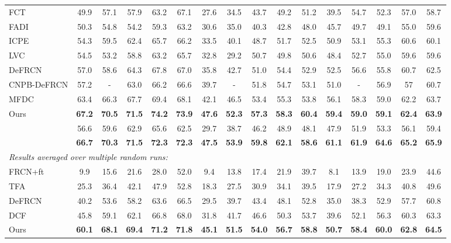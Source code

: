 \documentclass{article}
\begin{document}
\begin{table*}[!hbt]
\begin{adjustbox}{width=1\textwidth}
{\begin{tabular}{l|ccccc|ccccc|ccccc}
     FCT \cite{FCT} & 49.9 & 57.1 & 57.9 & 63.2 & 67.1 &27.6& 34.5 &43.7& 49.2 &51.2& 39.5 &54.7&52.3&57.0&58.7  \\
     FADI\cite{FADI} &50.3&54.8&54.2&59.3&63.2&30.6&35.0&40.3&42.8&48.0&45.7&49.7&49.1&55.0&59.6\\
     ICPE \cite{ICPE} & 54.3 & 59.5 &62.4 & 65.7 & 66.2 & 33.5 &40.1& 48.7 &51.7& 52.5 & 50.9 &53.1&55.3&60.6&60.1  \\
     LVC \cite{LVC} & 54.5 &53.2 & 58.8 & 63.2 & 65.7 &32.8& 29.2 &50.7& 49.8 & 50.6 &48.4&52.7&55.0&59.6&59.6  \\
    DeFRCN \cite{defrcn} &57.0 &58.6&64.3&67.8&67.0&35.8&42.7&51.0&54.4&52.9&52.5&56.6&55.8&60.7&62.5 \\
     CNPB-DeFRCN \cite{CNPB} & 57.2 &- & 63.0 & 66.2 & 66.6 &39.7& - &51.8& 54.7 & 53.1 &51.0&-&56.9&57&60.7  \\
     MFDC \cite{MFD} & 63.4 &66.3 & 67.7 & 69.4 & 68.1 &42.1& 46.5 &53.4& 55.3 & 53.8 &56.1&58.3&59.0&62.2&63.7  \\
    \rowcolor{Gray}
    Ours   &{\bf 67.2}&{\bf 70.5}&{\bf 71.5}&{\bf 74.2}&{\bf 73.9}&{\bf 47.6}&{\bf 52.3}&{\bf 57.3}&{\bf 58.3}&{\bf 60.4}&{\bf 59.4}&{\bf 59.0}&{\bf 59.1}&{\bf 62.4}&{\bf 63.9}\\
    \hline 
     \cite{dcf}   &56.6&59.6&62.9&65.6&62.5&29.7&38.7&46.2&48.9&48.1&47.9&51.9&53.3&56.1&59.4 \\
    \rowcolor{Gray}
       &{\bf 66.7}&{\bf 70.3}&{\bf 71.5}&{\bf 72.3}&{\bf 72.3}&{\bf 47.5}&{\bf 53.9}&{\bf 59.8}&{\bf 62.1}&{\bf 58.6}&{\bf 61.1}&{\bf 61.9}&{\bf 64.6}&{\bf 65.2}&{\bf 65.9}\\
    \midrule 
\multicolumn{16}{l}{\textit{Results averaged over multiple random runs:}}\\
    FRCN+ft \cite{metarcnn} & 9.9& 15.6  &21.6  &28.0  &52.0  &9.4& 13.8& 17.4&21.9& 39.7 &8.1&13.9&19.0&23.9&44.6\\
    TFA  \cite{tfa} & 25.3 & 36.4 & 42.1 & 47.9 & 52.8 & 18.3 & 27.5 & 30.9 & 34.1 & 39.5 & 17.9 & 27.2 & 34.3 & 40.8 & 49.6 \\
    DeFRCN \cite{defrcn}  &40.2 & 53.6 & 58.2 & 63.6 & 66.5 &29.5&39.7&43.4&48.1&52.8& 35.0 & 38.3 & 52.9 & 57.7 & 60.8 \\
    DCF  \cite{dcf} & 45.8&59.1&62.1&66.8&68.0&31.8&41.7&46.6&50.3&53.7&39.6&52.1&56.3&60.3&63.3\\
    \rowcolor{Gray}
    Ours   & {\bf 60.1}& {\bf 68.1} & {\bf 69.4} & {\bf 71.2} & {\bf 71.8} & {\bf 45.1} & {\bf 51.5} & {\bf 54.0} & {\bf 56.7} & {\bf 58.8} & {\bf 50.7} & {\bf 58.4} & {\bf 60.0} & {\bf 62.8} & {\bf 64.5} \\
    \bottomrule

  \end{tabular}
  }
\end{adjustbox}
\label{tab:PascalVOC1}
\end{table*}
\end{document}
